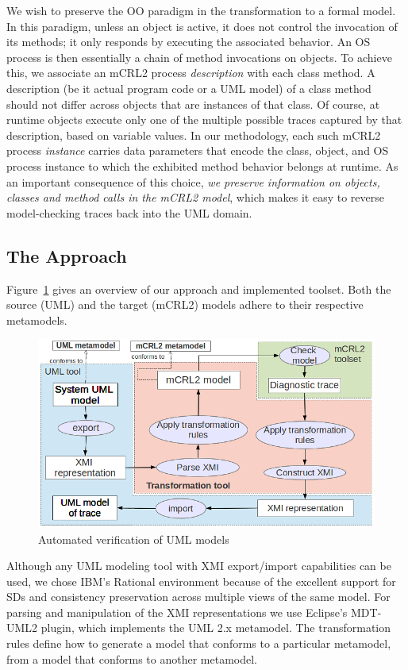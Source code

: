 \documentclass[letter]{llncs}
\newcommand{\figshrink}{\vspace{-.6cm}}
\newcommand{\figshrinkend}{}
\newcommand{\subsecshrink}{\vspace{-.5cm}}
\newcommand{\subsecshrinkbegin}{\vspace{-.2cm}}
\begin{document}
We wish to preserve the OO paradigm in the transformation to a formal model. In this paradigm, unless an object is active, 
it does not control the invocation of its methods; it only responds by executing the associated behavior. 
An OS process is then essentially a chain of method invocations on objects. To achieve this, we associate an mCRL2 process \emph{description} with each class method.
A description (be it actual program code or a UML model) of a class method should not differ across objects that are instances of that class. 
Of course, at runtime objects execute only one of the multiple possible traces captured by that description, based on variable values. 
In our methodology, each such mCRL2 process \emph{instance} carries data parameters that encode the class, object, and OS process instance to which the
exhibited method behavior belongs at runtime. As an important consequence of this choice, \emph{we preserve information on objects, classes and method calls in the mCRL2 model}, which
makes it easy to reverse model-checking traces back into the UML domain.
\subsecshrink
\subsection{The Approach}
\subsecshrinkbegin
Figure~\ref{fig:approach} gives an overview of our approach and implemented toolset. 
Both the source (UML) and the target (mCRL2) models adhere to their respective metamodels.
\begin{figure}[!t]
\centering
\figshrink
\includegraphics[width=0.8\linewidth,keepaspectratio=true]{./Approach.png}
\caption{Automated verification of UML models}
\label{fig:approach}
\figshrinkend
\end{figure}
Although any UML modeling tool with XMI export/import capabilities can be used, we chose IBM's Rational environment
because of the excellent support for SDs and consistency preservation across multiple views of the same model.
For parsing and manipulation of the XMI representations we use Eclipse's MDT-UML2 plugin, which implements the UML 2.x metamodel.
The transformation rules define how to generate a model that conforms to a
particular metamodel, from a model that conforms to another metamodel.
\end{document}
